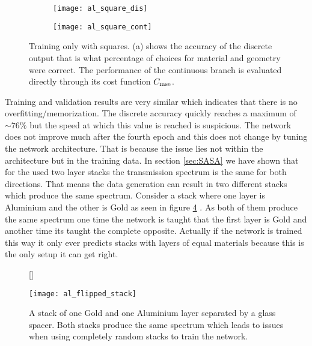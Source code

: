 \begin{figure}[H]
\centering
\captionsetup[subfigure]{position=b}
\begin{subfigure}{.5\textwidth}
    \centering
    \texttt{[image: al\_square\_dis]}
    \caption{}
    \label{}
\end{subfigure}%
\begin{subfigure}{.5\textwidth}
    \centering
    \texttt{[image: al\_square\_cont]}
    \caption{}
    \label{}
\end{subfigure}

\caption{Training only with squares. (a) shows the accuracy of the discrete output that is what percentage of choices for material and geometry were correct. The performance of the continuous branch is evaluated directly through its cost function $C_{\mathrm{mse}}$.}
\label{fig:al:square_results}
\end{figure}


Training and validation results are very similar which indicates that there is no overfitting/memorization. The discrete accuracy quickly reaches a maximum of $\sim 76\%$ but the speed at which this value is reached is suspicious. The network does not improve much after the fourth epoch and this does not change by tuning the network architecture. That is because the issue lies not within the architecture but in the training data. In section \ref{sec:SASA} we have shown that for the used two layer stacks the transmission spectrum is the same for both directions. That means the data generation can result in two different stacks which produce the same spectrum. Consider a stack where one layer is Aluminium and the other is Gold as seen in figure \ref{fig:al:same_spec} . As both of them produce the same spectrum one time the network is taught that the first layer is Gold and another time its taught the complete opposite. Actually if the network is trained this way it only ever predicts stacks with layers of equal materials because this is the only setup it can get right.
\\

\begin{figure}[H]
    [\FBwidth]
    {\caption{A stack of one Gold and one Aluminium layer separated by a glass spacer. Both stacks produce the same spectrum which leads to issues when using completely random stacks to train the network.}
    \label{fig:al:same_spec}}
    {\texttt{[image: al\_flipped\_stack]}}
\end{figure}


